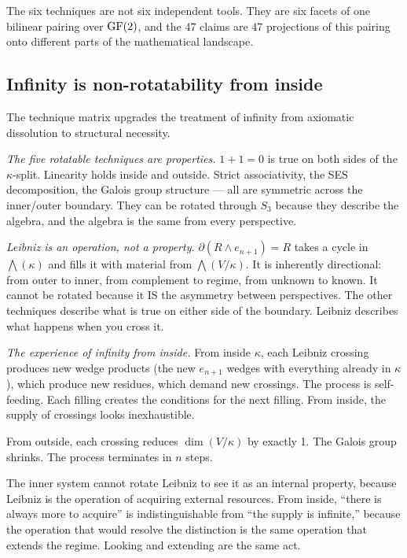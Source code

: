 The six techniques are not six independent tools. They
are six facets of one bilinear pairing over $\operatorname{GF}(2)$,
and the 47 claims are 47 projections of this pairing
onto different parts of the mathematical landscape.


\subsection{Infinity is non-rotatability from inside}
\label{sec:infinity-nonrotatable}

The technique matrix upgrades the treatment of infinity
from axiomatic dissolution to structural necessity.

\emph{The five rotatable techniques are properties.}
$1{+}1{=}0$ is true on both sides of the $\kappa$-split.
Linearity holds inside and outside. Strict associativity,
the SES decomposition, the Galois group structure --- all
are symmetric across the inner/outer boundary. They can
be rotated through $S_3$ because they describe the
algebra, and the algebra is the same from every
perspective.

\emph{Leibniz is an operation, not a property.}
$\partial(R \wedge e_{n+1}) = R$ takes a cycle in
$\bigwedge(\kappa)$ and fills it with material from
$\bigwedge(V/\kappa)$. It is inherently directional:
from outer to inner, from complement to regime, from
unknown to known. It cannot be rotated because it IS
the asymmetry between perspectives. The other techniques
describe what is true on either side of the boundary.
Leibniz describes what happens when you cross it.

\emph{The experience of infinity from inside.}
From inside $\kappa$, each Leibniz crossing produces new
wedge products (the new $e_{n+1}$ wedges with everything
already in $\kappa$), which produce new residues, which
demand new crossings. The process is self-feeding. Each
filling creates the conditions for the next filling.
From inside, the supply of crossings looks inexhaustible.

From outside, each crossing reduces $\dim(V/\kappa)$ by
exactly 1. The Galois group shrinks. The process
terminates in $n$ steps.

The inner system cannot rotate Leibniz to see it as an
internal property, because Leibniz is the operation of
acquiring external resources. From inside, ``there is
always more to acquire'' is indistinguishable from ``the
supply is infinite,'' because the operation that would
resolve the distinction is the same operation that extends
the regime. Looking and extending are the same act.

